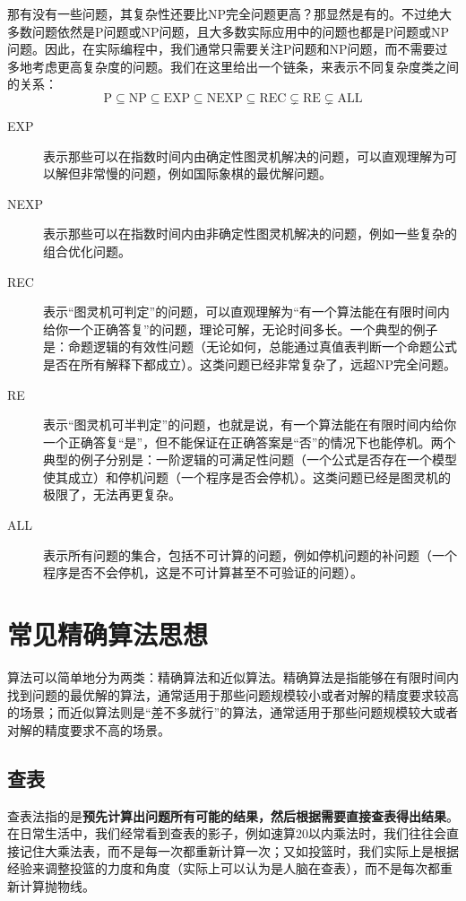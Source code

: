 \begin{reading}[NP完全问题简介]
    那有没有一些问题，其复杂性还要比NP完全问题更高？那显然是有的。不过绝大多数问题依然是P问题或NP问题，且大多数实际应用中的问题也都是P问题或NP问题。因此，在实际编程中，我们通常只需要关注P问题和NP问题，而不需要过多地考虑更高复杂度的问题。我们在这里给出一个链条，来表示不同复杂度类之间的关系：
    \[\text{P} \subseteq \text{NP} \subseteq \text{EXP} \subseteq \text{NEXP} \subseteq \text{REC} \subsetneq  \text{RE} \subsetneq \text{ALL}\]
    \begin{description}
        \item[EXP] 表示那些可以在指数时间内由确定性图灵机解决的问题，可以直观理解为可以解但非常慢的问题，例如国际象棋的最优解问题。
        \item[NEXP] 表示那些可以在指数时间内由非确定性图灵机解决的问题，例如一些复杂的组合优化问题。
        \item[REC] 表示“图灵机可判定”的问题，可以直观理解为“有一个算法能在有限时间内给你一个正确答复”的问题，理论可解，无论时间多长。一个典型的例子是：命题逻辑的有效性问题（无论如何，总能通过真值表判断一个命题公式是否在所有解释下都成立）。这类问题已经非常复杂了，远超NP完全问题。
        \item[RE] 表示“图灵机可半判定”的问题，也就是说，有一个算法能在有限时间内给你一个正确答复“是”，但不能保证在正确答案是“否”的情况下也能停机。两个典型的例子分别是：一阶逻辑的可满足性问题（一个公式是否存在一个模型使其成立）和停机问题（一个程序是否会停机）。这类问题已经是图灵机的极限了，无法再更复杂。
        \item[ALL] 表示所有问题的集合，包括不可计算的问题，例如停机问题的补问题（一个程序是否不会停机，这是不可计算甚至不可验证的问题）。
    \end{description}

\end{reading}

\section{常见精确算法思想}

算法可以简单地分为两类：精确算法和近似算法。精确算法是指能够在有限时间内找到问题的最优解的算法，通常适用于那些问题规模较小或者对解的精度要求较高的场景；而近似算法则是“差不多就行”的算法，通常适用于那些问题规模较大或者对解的精度要求不高的场景。

\subsection{查表}

查表法指的是\textbf{预先计算出问题所有可能的结果，然后根据需要直接查表得出结果}。在日常生活中，我们经常看到查表的影子，例如速算20以内乘法时，我们往往会直接记住大乘法表，而不是每一次都重新计算一次；又如投篮时，我们实际上是根据经验来调整投篮的力度和角度（实际上可以认为是人脑在查表），而不是每次都重新计算抛物线。

